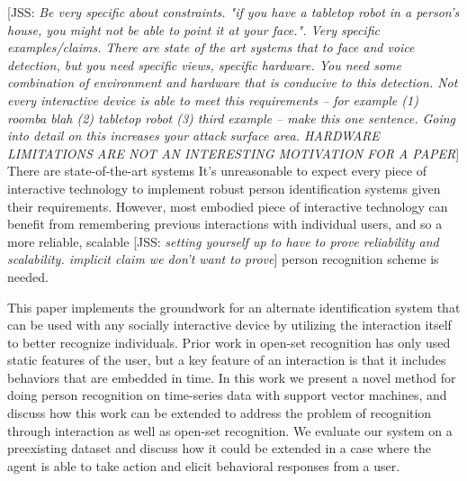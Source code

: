 \documentclass[conference]{IEEEtran}
\newcommand{\elaine}[1]{{\textcolor[rgb]{0.1,0.4,0.6}{[ESS: {\it #1}]}}}
\newcommand{\meta}[1]{{\textcolor[rgb]{0.1,0.7,0.2}{[JSS: {\it #1}]}}}
\begin{document}
\meta{Be very specific about constraints. "if you have a tabletop robot in a person's house, you might not be able to point it at your face.". Very specific examples/claims. There are state of the art systems that to face and voice detection, but you need specific views, specific hardware. You need some combination of environment and hardware that is conducive to this detection. Not every interactive device is able to meet this requirements -- for example (1) roomba blah (2) tabletop robot (3) third example -- make this one sentence. Going into detail on this increases your attack surface area. HARDWARE LIMITATIONS ARE NOT AN INTERESTING MOTIVATION FOR A PAPER}
There are state-of-the-art systems 
It's unreasonable to expect every piece of interactive technology to implement robust person identification systems given their requirements. However, most embodied piece of interactive technology can benefit from remembering previous interactions with individual users, and so a more reliable, scalable \meta{setting yourself up to have to prove reliability and scalability. implicit claim we don't want to prove} person recognition scheme is needed. 

This paper implements the groundwork for an alternate identification system that can be used with any socially interactive device by utilizing the interaction itself to better recognize individuals. Prior work in open-set recognition has only used static features of the user, but a key feature of an interaction is that it includes behaviors that are embedded in time. In this work we present a novel method for doing person recognition on time-series data with support vector machines, and discuss how this work can be extended to address the problem of recognition through interaction as well as open-set recognition. We evaluate our system on a preexisting dataset and discuss how it could be extended in a case where the agent is able to take action and elicit behavioral responses from a user. 


\end{document}
